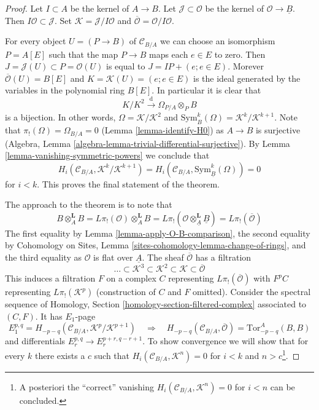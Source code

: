 \begin{proof}
Let $I \subset A$ be the kernel of $A \to B$. Let
$\mathcal{J} \subset \mathcal{O}$
be the kernel of $\mathcal{O} \to \underline{B}$. Then
$I\mathcal{O} \subset \mathcal{J}$. Set
$\mathcal{K} = \mathcal{J}/I\mathcal{O}$ and
$\overline{\mathcal{O}} = \mathcal{O}/I\mathcal{O}$.

\medskip\noindent
For every object $U = (P \to B)$ of $\mathcal{C}_{B/A}$
we can choose an isomorphism $P = A[E]$ such that the map
$P \to B$ maps each $e \in E$ to zero. Then
$J = \mathcal{J}(U) \subset P = \mathcal{O}(U)$
is equal to $J = IP + (e; e \in E)$. Morever
$\overline{\mathcal{O}}(U) = B[E]$ and $K = \mathcal{K}(U) = (e; e \in E)$
is the ideal generated by the variables in the polynomial ring $B[E]$.
In particular it is clear that
$$
K/K^2 \xrightarrow{\text{d}} \Omega_{P/A} \otimes_P B
$$
is a bijection. In other words, $\Omega = \mathcal{K}/\mathcal{K}^2$
and $\text{Sym}_B^k(\Omega) = \mathcal{K}^k/\mathcal{K}^{k + 1}$.
Note that $\pi_!(\Omega) = \Omega_{B/A} = 0$ (Lemma \ref{lemma-identify-H0})
as $A \to B$ is surjective
(Algebra, Lemma \ref{algebra-lemma-trivial-differential-surjective}).
By Lemma \ref{lemma-vanishing-symmetric-powers} we conclude that
$$
H_i(\mathcal{C}_{B/A}, \mathcal{K}^k/\mathcal{K}^{k + 1}) =
H_i(\mathcal{C}_{B/A}, \text{Sym}^k_{\underline{B}}(\Omega)) = 0
$$
for $i < k$. This proves the final statement of the theorem.

\medskip\noindent
The approach to the theorem is to note that
$$
B \otimes_A^\mathbf{L} B = L\pi_!(\mathcal{O}) \otimes_A^\mathbf{L} B =
L\pi_!(\mathcal{O} \otimes_{\underline{A}}^\mathbf{L} \underline{B}) =
L\pi_!(\overline{\mathcal{O}})
$$
The first equality by Lemma \ref{lemma-apply-O-B-comparison},
the second equality by
Cohomology on Sites, Lemma \ref{sites-cohomology-lemma-change-of-rings}, and
the third equality as $\mathcal{O}$ is flat over $\underline{A}$.
The sheaf $\overline{\mathcal{O}}$ has a filtration
$$
\ldots \subset
\mathcal{K}^3 \subset
\mathcal{K}^2 \subset
\mathcal{K} \subset
\overline{\mathcal{O}}
$$
This induces a filtration $F$ on a complex $C$ representing
$L\pi_!(\overline{\mathcal{O}})$ with $F^pC$ representing
$L\pi_!(\mathcal{K}^p)$ (construction of $C$ and $F$ omitted).
Consider the spectral sequence of
Homology, Section \ref{homology-section-filtered-complex}
associated to $(C, F)$. It has $E_1$-page
$$
E_1^{p, q} = H_{- p - q}(\mathcal{C}_{B/A}, \mathcal{K}^p/\mathcal{K}^{p + 1})
\quad\Rightarrow\quad
H_{- p - q}(\mathcal{C}_{B/A}, \overline{\mathcal{O}}) = 
\text{Tor}_{- p - q}^A(B, B)
$$
and differentials $E_r^{p, q} \to E_r^{p + r, q - r + 1}$. To show convergence
we will show that for every $k$ there exists a $c$ such that
$H_i(\mathcal{C}_{B/A}, \mathcal{K}^n) = 0$
for $i < k$ and $n > c$\footnote{A posteriori
the ``correct'' vanishing $H_i(\mathcal{C}_{B/A}, \mathcal{K}^n) = 0$ for
$i < n$ can be concluded.}.


\end{proof}
